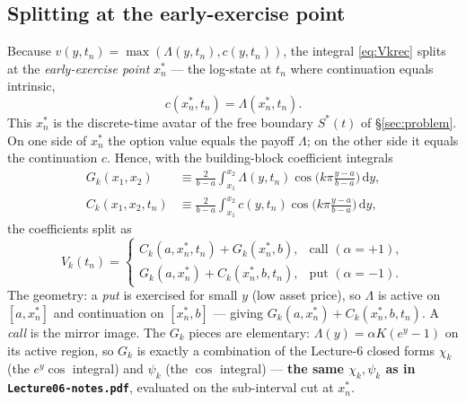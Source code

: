 \documentclass[11pt]{article}
\newcommand{\dd}{\,\mathrm{d}}
\begin{document}
\subsection{Splitting at the early-exercise point}
Because $v(y,t_n)=\max(\Lambda(y,t_n),c(y,t_n))$, the integral \eqref{eq:Vkrec} splits at the
\emph{early-exercise point} $x_n^\ast$ --- the log-state at $t_n$ where continuation equals intrinsic,
\begin{equation}\label{eq:xstar}
c(x_n^\ast,t_n)=\Lambda(x_n^\ast,t_n).
\end{equation}
This $x_n^\ast$ is the discrete-time avatar of the free boundary $S^\ast(t)$ of \S\ref{sec:problem}. On one
side of $x_n^\ast$ the option value equals the payoff $\Lambda$; on the other side it equals the continuation
$c$. Hence, with the building-block coefficient integrals
\begin{align}
G_k(x_1,x_2)&\equiv\frac{2}{b-a}\int_{x_1}^{x_2}\Lambda(y,t_n)\cos\!\Big(k\pi\frac{y-a}{b-a}\Big)\dd y,
\label{eq:Gk}\\
C_k(x_1,x_2,t_n)&\equiv\frac{2}{b-a}\int_{x_1}^{x_2} c(y,t_n)\cos\!\Big(k\pi\frac{y-a}{b-a}\Big)\dd y,
\label{eq:Ck}
\end{align}
the coefficients split as
\begin{equation}\label{eq:Vksplit}
V_k(t_n)=
\begin{cases}
C_k(a,x_n^\ast,t_n)+G_k(x_n^\ast,b), & \text{call }(\alpha=+1),\\[1ex]
G_k(a,x_n^\ast)+C_k(x_n^\ast,b,t_n), & \text{put }(\alpha=-1).
\end{cases}
\end{equation}
The geometry: a \emph{put} is exercised for small $y$ (low asset price), so $\Lambda$ is active on $[a,x_n^\ast]$
and continuation on $[x_n^\ast,b]$ --- giving $G_k(a,x_n^\ast)+C_k(x_n^\ast,b,t_n)$. A \emph{call} is the mirror
image. The $G_k$ pieces are elementary: $\Lambda(y)=\alpha K(e^y-1)$ on its active region, so $G_k$ is exactly a
combination of the Lecture-6 closed forms $\chi_k$ (the $e^y\cos$ integral) and $\psi_k$ (the $\cos$ integral) ---
\textbf{the same $\chi_k,\psi_k$ as in \texttt{Lecture06-notes.pdf}}, evaluated on the sub-interval cut at
$x_n^\ast$.
\end{document}
